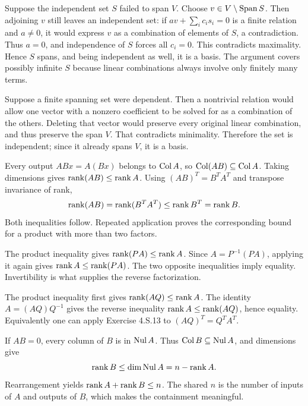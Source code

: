 Suppose the independent set $S$ failed to span $V$. Choose
$v\in V\setminus\operatorname{Span} S$. Then adjoining $v$ still leaves an independent
set: if $av+\sum_i c_i s_i=0$ is a finite relation and $a\ne0$, it would
express $v$ as a combination of elements of $S$, a contradiction.
Thus $a=0$, and independence of $S$ forces all $c_i=0$.
This contradicts maximality. Hence $S$ spans, and being independent as
well, it is a basis. The argument covers possibly infinite $S$ because
linear combinations always involve only finitely many terms.

Suppose a finite spanning set were dependent. Then a nontrivial relation
would allow one vector with a nonzero coefficient to be solved for as a
combination of the others. Deleting that vector would preserve every
original linear combination, and thus preserve the span $V$.
That contradicts minimality. Therefore the set is independent; since it
already spans $V$, it is a basis.

Every output $ABx=A(Bx)$ belongs to $\operatorname{Col} A$, so $\operatorname{Col}(AB)\subseteq\operatorname{Col} A$.
Taking dimensions gives $\operatorname{rank}(AB)\le\operatorname{rank} A$.
Using $(AB)^T=B^TA^T$ and transpose invariance of rank,
\[
 \operatorname{rank}(AB)=\operatorname{rank}(B^TA^T)\le\operatorname{rank} B^T=\operatorname{rank} B.
\]
Both inequalities follow. Repeated application proves the corresponding
bound for a product with more than two factors.

The product inequality gives $\operatorname{rank}(PA)\le\operatorname{rank} A$.
Since $A=P^{-1}(PA)$, applying it again gives
$\operatorname{rank} A\le\operatorname{rank}(PA)$. The two opposite inequalities imply equality.
Invertibility is what supplies the reverse factorization.

The product inequality first gives $\operatorname{rank}(AQ)\le\operatorname{rank} A$.
The identity $A=(AQ)Q^{-1}$ gives the reverse inequality
$\operatorname{rank} A\le\operatorname{rank}(AQ)$, hence equality. Equivalently one can apply
Exercise 4.S.13 to $(AQ)^T=Q^TA^T$.

If $AB=0$, every column of $B$ is in $\operatorname{Nul} A$.
Thus $\operatorname{Col} B\subseteq\operatorname{Nul} A$, and dimensions give
\[
 \operatorname{rank} B\le\dim\operatorname{Nul} A=n-\operatorname{rank} A.
\]
Rearrangement yields $\operatorname{rank} A+\operatorname{rank} B\le n$.
The shared $n$ is the number of inputs of $A$ and outputs of $B$,
which makes the containment meaningful.

